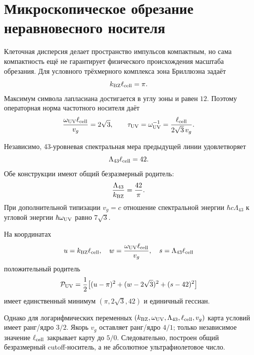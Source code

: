 \chapter{Микроскопическое обрезание неравновесного носителя}
\label{ch:v10-nonequilibrium-bath-microscopic-cutoff}

Клеточная дисперсия делает пространство импульсов компактным, но сама
компактность ещё не гарантирует физического происхождения масштаба
обрезания. Для условного трёхмерного комплекса зона Бриллюэна задаёт
\begin{equation}
 k_{\rm BZ}\ell_{\rm cell}=\pi.
\end{equation}
Максимум символа лапласиана достигается в углу зоны и равен $12$. Поэтому
операторная норма частотного носителя даёт
\begin{equation}
 \frac{\omega_{\rm UV}\ell_{\rm cell}}{v_g}=2\sqrt3,
 \qquad
 \tau_{\rm UV}=\omega_{\rm UV}^{-1}
 =\frac{\ell_{\rm cell}}{2\sqrt3\,v_g}.
\end{equation}

Независимо, 43-уровневая спектральная мера предыдущей линии удовлетворяет
\begin{equation}
 \Lambda_{43}\ell_{\rm cell}=42.
\end{equation}
Обе конструкции имеют общий безразмерный родитель:
\begin{equation}
 \frac{\Lambda_{43}}{k_{\rm BZ}}=\frac{42}{\pi}.
\end{equation}
При дополнительной типизации $v_g=c$ отношение спектральной энергии
$\hbar c\Lambda_{43}$ к угловой энергии $\hbar\omega_{\rm UV}$ равно
$7\sqrt3$.

На координатах
\begin{equation}
 u=k_{\rm BZ}\ell_{\rm cell},\quad
 w=\frac{\omega_{\rm UV}\ell_{\rm cell}}{v_g},\quad
 s=\Lambda_{43}\ell_{\rm cell}
\end{equation}
положительный родитель
\begin{equation}
 \mathcal P_{\rm UV}
 =\frac12\bigl[(u-\pi)^2+(w-2\sqrt3)^2+(s-42)^2\bigr]
\end{equation}
имеет единственный минимум $(\pi,2\sqrt3,42)$ и единичный гессиан.

Однако для логарифмических переменных
$(k_{\rm BZ},\omega_{\rm UV},\Lambda_{43},\ell_{\rm cell},v_g)$
карта условий имеет ранг/ядро $3/2$. Якорь $v_g$ оставляет ранг/ядро
$4/1$; только независимое значение $\ell_{\rm cell}$ закрывает карту до
$5/0$. Следовательно, построен общий безразмерный cutoff-носитель, а не
абсолютное ультрафиолетовое число.

